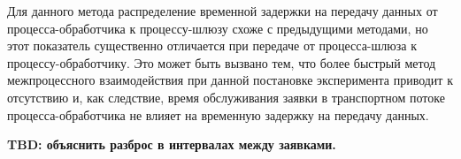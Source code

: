 Для данного метода распределение временной задержки на передачу данных от процесса-обработчика к процессу-шлюзу схоже с предыдущими методами, но этот показатель существенно отличается при передаче от процесса-шлюза к процессу-обработчику. Это может быть вызвано тем, что более быстрый метод межпроцессного взаимодействия при данной постановке эксперимента приводит к отсутствию и, как следствие, время обслуживания заявки в транспортном потоке процесса-обработчика не влияет на временную задержку на передачу данных.

\textbf{TBD: объяснить разброс в интервалах между заявками.}
